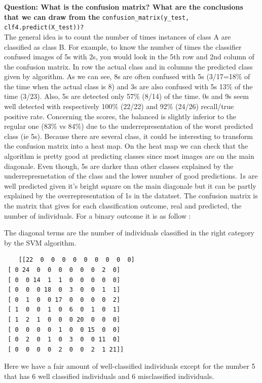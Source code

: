 \textbf{Question: What is the confusion matrix? What are the conclusions that we can draw from the} \verb|confusion_matrix(y_test, clf4.predict(X_test))?| \\

The general idea is to count the number of times instances of class A are classified as class B. For example, to know the number of times the classifier confused images of 5s with 2s, you would look in the 5th row and 2nd column of the confusion
matrix. In row the actual class and in columns the predicted class given by algorithm.
As we can see, 8s are often confused with 5s (3/17=18\% of the time when the actual class is 8) and 3s are also confused with 5s 13\% of the time (3/23). Also, 5s are detected only 57\% (8/14) of the time. 0s and 9s seem well detected with respectively 100\% (22/22) and 92\% (24/26) recall/true positive rate.
Concerning the scores, the balanced is slightly inferior to the regular one (83\% vs 84\%) due to the underrepresentation of the worst predicted class (ie 5s).
Because there are several class, it could be interesting to transform the confusion matrix into a heat map. 
On the heat map we can check that the algorithm is pretty good at predicting classes since most images are on the main diagonale. Even though, 5s are darker than other classes explained by the underrepresnetation of the class and the lower number of good predictions. 1s are well predicted given it's bright square on the main diagonale but it can be partly explained by the overrepresentation of 1s in the datatset. 
The confusion matrix is the matrix that gives for each classification outcome, real and predicted, the number of individuals. For a binary outcome it is as follow : 

The diagonal terms are the number of individuals classified in the right category by the SVM algorithm. 
\begin{verbatim}
	[[22  0  0  0  0  0  0  0  0  0]
 [ 0 24  0  0  0  0  0  0  2  0]
 [ 0  0 14  1  1  0  0  0  0  0]
 [ 0  0  0 18  0  3  0  0  1  1]
 [ 0  1  0  0 17  0  0  0  0  2]
 [ 1  0  0  1  0  6  0  1  0  1]
 [ 1  2  1  0  0  0 20  0  0  0]
 [ 0  0  0  0  1  0  0 15  0  0]
 [ 0  2  0  1  0  3  0  0 11  0]
 [ 0  0  0  0  2  0  0  2  1 21]]
\end{verbatim}
Here we have a fair amount of well-classified individuals except for the number 5 that has 6 well classified individuals and 6 misclassified individuals. 

